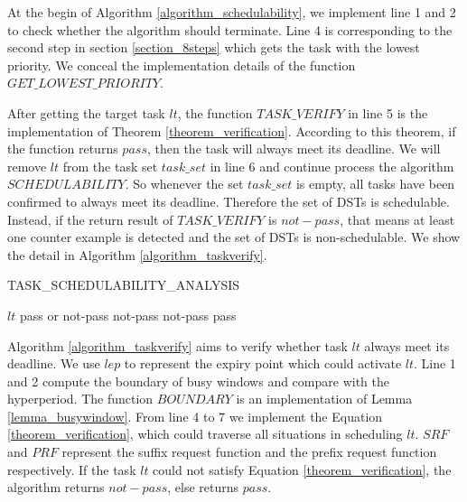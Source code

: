 \documentclass[sigconf]{acmart}
\begin{document}
At the begin of Algorithm \ref{algorithm_schedulability}, we implement line 1 and 2 to check whether the algorithm should terminate. Line 4 is corresponding to the second step in section \ref{section_8steps} which gets the task with the lowest priority. We conceal the implementation details of the function $GET\_LOWEST\_PRIORITY$. 

After getting the target task $lt$, the function $TASK\_VERIFY$ in line 5 is the implementation of Theorem \ref{theorem_verification}. According to this theorem, if the function returns $pass$, then the task will always meet its deadline. We will remove $lt$ from the task set $task\_set$ in line 6 and continue process the algorithm $SCHEDULABILITY$. So whenever the set $task\_set$ is empty, all tasks have been confirmed to always meet its deadline. Therefore the set of DSTs is schedulable. Instead, if the return result of $TASK\_VERIFY$ is $not-pass$, that means at least one counter example is detected and the set of DSTs is non-schedulable. We show the detail in Algorithm \ref{algorithm_taskverify}.


\begin{algorithm}
  \caption{TASK\_SCHEDULABILITY\_ANALYSIS}
  \label{algorithm_taskverify}
  \begin{algorithmic}[1]
    \REQUIRE $lt$
    \ENSURE pass or not-pass
    \STATE \Return not-pass
    \ELSE
    \STATE \Return not-pass
    \ENDIF
    \ENDFOR
    \ENDFOR
    \ENDFOR
    \STATE \Return pass
    \ENDIF
  \end{algorithmic}
\end{algorithm}

Algorithm \ref{algorithm_taskverify} aims to verify whether task $lt$ always meet its deadline. We use $lep$ to represent the expiry point which could activate $lt$. Line 1 and 2 compute the boundary of busy windows and compare with the hyperperiod. The function $BOUNDARY$ is an implementation of Lemma \ref{lemma_busywindow}. From line 4 to 7 we implement the Equation \ref{theorem_verification}, which could traverse all situations in scheduling $lt$. $SRF$ and $PRF$ represent the suffix request function and the prefix request function respectively. If the task $lt$ could not satisfy Equation \ref{theorem_verification}, the algorithm returns $not-pass$, else returns $pass$.
\end{document}
